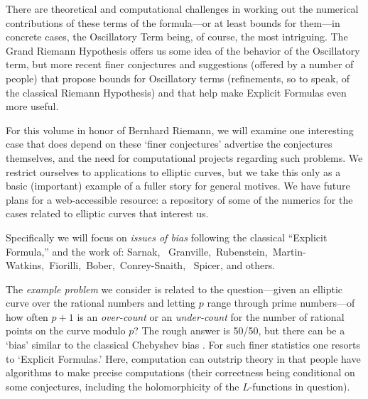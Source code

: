 \documentclass[11pt]{article}
\theoremstyle{plain}
\theoremstyle{definition}
\numberwithin{equation}{section}
\numberwithin{figure}{section}
\numberwithin{table}{section}
\begin{document}
 There are theoretical and computational challenges in working out the  numerical contributions of these terms of the formula---or at least bounds for them---in concrete cases, the Oscillatory Term being, of course, the most intriguing. The Grand Riemann Hypothesis offers us some idea of the behavior of the Oscillatory term, but more recent  finer conjectures and suggestions (offered by a number of people) that propose bounds for Oscillatory terms  (refinements, so to speak, of the classical Riemann Hypothesis)  and that help make Explicit Formulas  even more useful.

   For this volume in honor of Bernhard Riemann,  we will examine one interesting case  that does depend on these `finer conjectures'  advertise the conjectures themselves, and  the need for  computational projects regarding  such problems.  We restrict ourselves to applications to elliptic curves, but we take this only as a basic (important) example of a fuller story for general motives.  We have  future plans for a web-accessible resource: a repository of some of the numerics for the cases related to elliptic curves that interest us.

  Specifically we will  focus on {\it issues of bias}  following the classical ``Explicit Formula,'' and the work of:
Sarnak, \ Granville,\  Rubenstein,\, Martin-Watkins,\ Fiorilli,\ Bober,\ Conrey-Snaith, \ Spicer, and others.


 The {\it example problem} we consider is related to the question---given an elliptic curve over the rational numbers and letting  $p$ range through prime numbers---of how often  $p+1$ is an {\it over-count} or an {\it under-count} for the number of rational points on the curve modulo $p$? The rough answer is 50/50, but there can be a `bias' similar to the classical Chebyshev bias  \cite{R-S}. For such finer statistics one resorts to `Explicit Formulas.'  Here, computation can  outstrip theory in that people have algorithms to make precise computations (their correctness being conditional on some conjectures, including the holomorphicity of the $L$-functions in question).
\end{document}
